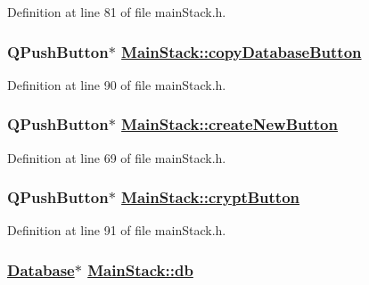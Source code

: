 Definition at line 81 of file main\-Stack.h.\hypertarget{classMainStack_r31}{
\subsubsection[copyDatabaseButton]{\setlength{\rightskip}{0pt plus 5cm}QPush\-Button$\ast$ \hyperlink{classMainStack_r31}{Main\-Stack::copy\-Database\-Button}}}
\label{classMainStack_r31}


Definition at line 90 of file main\-Stack.h.\hypertarget{classMainStack_r12}{
\subsubsection[createNewButton]{\setlength{\rightskip}{0pt plus 5cm}QPush\-Button$\ast$ \hyperlink{classMainStack_r12}{Main\-Stack::create\-New\-Button}}}
\label{classMainStack_r12}


Definition at line 69 of file main\-Stack.h.\hypertarget{classMainStack_r32}{
\subsubsection[cryptButton]{\setlength{\rightskip}{0pt plus 5cm}QPush\-Button$\ast$ \hyperlink{classMainStack_r32}{Main\-Stack::crypt\-Button}}}
\label{classMainStack_r32}


Definition at line 91 of file main\-Stack.h.\hypertarget{classMainStack_r0}{
\subsubsection[db]{\setlength{\rightskip}{0pt plus 5cm}\hyperlink{classDatabase}{Database}$\ast$ \hyperlink{classMainStack_r0}{Main\-Stack::db}}}
\label{classMainStack_r0}


